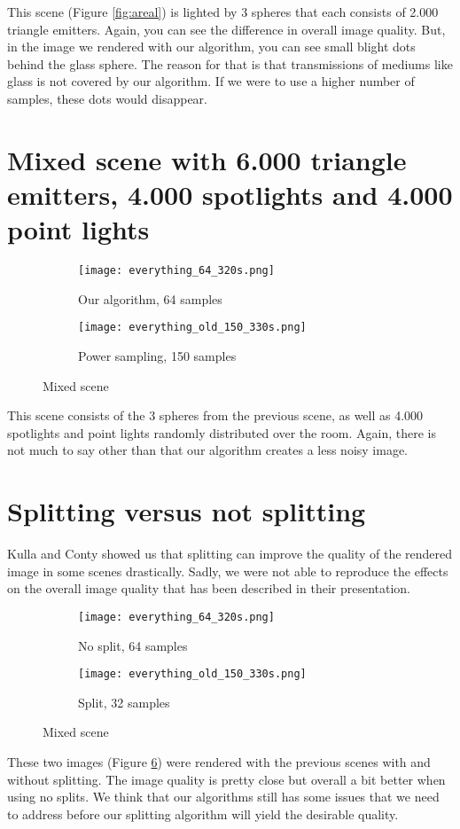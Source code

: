 This scene (Figure \ref{fig:areal}) is lighted by 3 spheres that each consists of 2.000 triangle emitters. Again, you can see the difference in overall image quality. But, in the image we rendered with our algorithm, you can see small blight dots behind the glass sphere. The reason for that is that transmissions of mediums like glass is not covered by our algorithm. If we were to use a higher number of samples, these dots would disappear.

\section{Mixed scene with 6.000 triangle emitters, 4.000 spotlights and 4.000 point lights}

\begin{figure}
	\centering
	\begin{subfigure}{.5\textwidth}
		\centering
		\texttt{[image: everything\_64\_320s.png]}
		\caption{Our algorithm, 64 samples}
		\label{fig:every1}
	\end{subfigure}%
	\begin{subfigure}{.5\textwidth}
		\centering
		\texttt{[image: everything\_old\_150\_330s.png]}
		\caption{Power sampling, 150 samples}
		\label{fig:every2}
	\end{subfigure}
	\caption{Mixed scene}
	\label{fig:every}
\end{figure}

This scene consists of the 3 spheres from the previous scene, as well as 4.000 spotlights and point lights randomly distributed over the room. Again, there is not much to say other than that our algorithm creates a less noisy image.

\section{Splitting versus not splitting}

Kulla and Conty \Cite{MLS} showed us that splitting can improve the quality of the rendered image in some scenes drastically. Sadly, we were not able to reproduce the effects on the overall image quality that has been described in their presentation.

\begin{figure}
	\centering
	\begin{subfigure}{.5\textwidth}
		\centering
		\texttt{[image: everything\_64\_320s.png]}
		\caption{No split, 64 samples}
		\label{fig:every3}
	\end{subfigure}%
	\begin{subfigure}{.5\textwidth}
		\centering
		\texttt{[image: everything\_old\_150\_330s.png]}
		\caption{Split, 32 samples}
		\label{fig:every4}
	\end{subfigure}
	\caption{Mixed scene}
	\label{fig:everyt}
\end{figure}

These two images (Figure \ref{fig:everyt}) were rendered with the previous scenes with and without splitting. The image quality is pretty close but overall a bit better when using no splits. We think that our algorithms still has some issues that we need to address before our splitting algorithm will yield the desirable quality.